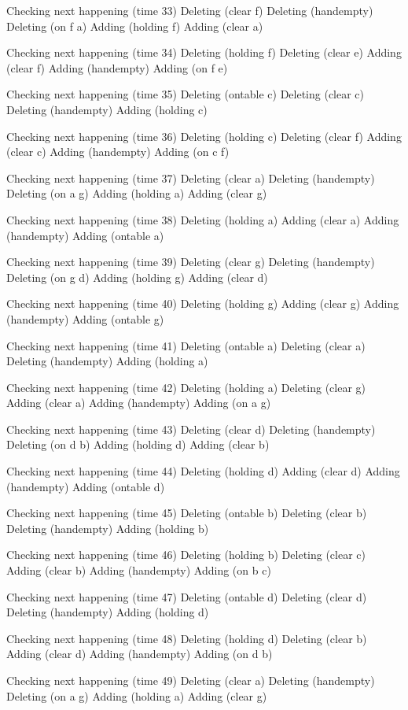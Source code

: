 Checking next happening (time 33)
Deleting (clear f)
Deleting (handempty)
Deleting (on f a)
Adding (holding f)
Adding (clear a)

Checking next happening (time 34)
Deleting (holding f)
Deleting (clear e)
Adding (clear f)
Adding (handempty)
Adding (on f e)

Checking next happening (time 35)
Deleting (ontable c)
Deleting (clear c)
Deleting (handempty)
Adding (holding c)

Checking next happening (time 36)
Deleting (holding c)
Deleting (clear f)
Adding (clear c)
Adding (handempty)
Adding (on c f)

Checking next happening (time 37)
Deleting (clear a)
Deleting (handempty)
Deleting (on a g)
Adding (holding a)
Adding (clear g)

Checking next happening (time 38)
Deleting (holding a)
Adding (clear a)
Adding (handempty)
Adding (ontable a)

Checking next happening (time 39)
Deleting (clear g)
Deleting (handempty)
Deleting (on g d)
Adding (holding g)
Adding (clear d)

Checking next happening (time 40)
Deleting (holding g)
Adding (clear g)
Adding (handempty)
Adding (ontable g)

Checking next happening (time 41)
Deleting (ontable a)
Deleting (clear a)
Deleting (handempty)
Adding (holding a)

Checking next happening (time 42)
Deleting (holding a)
Deleting (clear g)
Adding (clear a)
Adding (handempty)
Adding (on a g)

Checking next happening (time 43)
Deleting (clear d)
Deleting (handempty)
Deleting (on d b)
Adding (holding d)
Adding (clear b)

Checking next happening (time 44)
Deleting (holding d)
Adding (clear d)
Adding (handempty)
Adding (ontable d)

Checking next happening (time 45)
Deleting (ontable b)
Deleting (clear b)
Deleting (handempty)
Adding (holding b)

Checking next happening (time 46)
Deleting (holding b)
Deleting (clear c)
Adding (clear b)
Adding (handempty)
Adding (on b c)

Checking next happening (time 47)
Deleting (ontable d)
Deleting (clear d)
Deleting (handempty)
Adding (holding d)

Checking next happening (time 48)
Deleting (holding d)
Deleting (clear b)
Adding (clear d)
Adding (handempty)
Adding (on d b)

Checking next happening (time 49)
Deleting (clear a)
Deleting (handempty)
Deleting (on a g)
Adding (holding a)
Adding (clear g)

